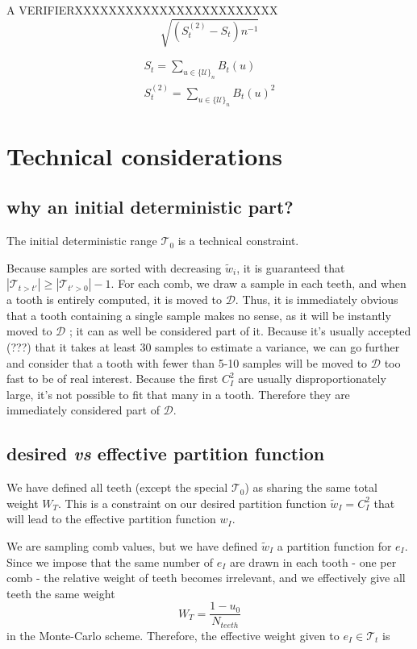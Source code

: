 \documentclass[./thesis.tex]{subfiles}
\begin{document}
\alert{A VERIFIERXXXXXXXXXXXXXXXXXXXXXXXX}
\begin{equation}
\sqrt{(S_{t}^{(2)} - S_{t}) n^{-1} }
\end{equation}		

\begin{align}
 S_{t} = \sum_{u \in \{\mathcal{U}\}_n} B_{t}(u) \\
 S^{(2)}_{t} = \sum_{u \in \{\mathcal{U}\}_n} B_{t}(u)^2
\end{align}




\section{Technical considerations}


\subsection*{why an initial deterministic part?}

The initial deterministic range $\mathcal{T}_0$ is a technical constraint.

Because samples are sorted with decreasing $\tilde w_i$, it is guaranteed that $|\mathcal{T}_{t>t'}| \geq |\mathcal{T}_{t'>0}|-1$.
For each comb, we draw a sample in each teeth, and when a tooth is entirely computed, it is moved to $\mathcal{D}$. Thus, it is immediately obvious that a tooth containing a single sample makes no sense, as it will be instantly moved to $\mathcal{D}$ ; it can as well be considered part of it. Because it's usually accepted (???) that it takes at least 30 samples to estimate a variance, we can go further and consider that a tooth with fewer than 5-10 samples will be moved to $\mathcal{D}$ too fast to be of real interest. Because the first $C_I^2$ are usually disproportionately large, it's not possible to fit that many in a tooth. Therefore they are immediately considered part of $\mathcal{D}$.

\subsection*{desired \textit{vs} effective partition function}

We have defined all teeth (except the special $\mathcal{T}_0$) as sharing the same total weight $W_T$. This is a constraint on our desired partition function $\tilde w_I = C_I^2$ that will lead to the effective partition function $w_I$.

We are sampling comb values, but we have defined $\tilde w_I$ a partition function for $e_I$. Since we impose that the same number of $e_I$ are drawn in each tooth - one per comb - the relative weight of teeth becomes irrelevant, and we effectively give all teeth the same weight 
\begin{equation}
W_T=\frac{1-u_0}{N_{teeth}}
\end{equation}
in the Monte-Carlo scheme. Therefore, the effective weight given to $e_I \in \mathcal{T}_t$ is
\end{document}
